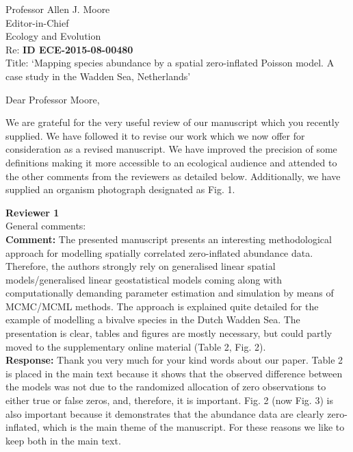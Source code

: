 \documentclass{letter}
\begin{document}
\begin{letter}{
Professor Allen J. Moore\\
Editor-in-Chief\\
Ecology and Evolution \\
\vspace{1cm}
Re: \textbf{ID ECE-2015-08-00480}\\
Title: `Mapping species abundance by a spatial zero-inflated Poisson model. A case study in the Wadden Sea, Netherlands'
}

\opening{Dear Professor Moore,}

We are grateful for the very useful review of our manuscript which you recently supplied. We have followed it to revise our work which we now offer for consideration as a revised manuscript. 
We have improved the precision of some definitions making it more accessible to an ecological audience and attended to the other comments from the reviewers as detailed below.  Additionally, we have supplied an organism photograph designated as Fig. 1.

\textbf{Reviewer 1}\\

General comments:\\
\textbf{Comment:} The presented manuscript presents an interesting methodological approach for modelling spatially correlated zero-inflated abundance data. Therefore, the authors strongly rely on  generalised linear spatial models/generalised linear geostatistical models coming along with computationally demanding parameter estimation and simulation by means of MCMC/MCML methods. The approach is explained quite detailed for the example of modelling a bivalve species in the Dutch Wadden Sea. The presentation is clear, tables and figures are mostly necessary, but could partly moved to the supplementary online material (Table 2, Fig. 2).\\
\textbf{Response:} 
Thank you very much for your kind words about our paper. Table 2 is placed in the main text because it shows that the observed difference between the models was not due to the randomized allocation of zero observations to either true or false zeros, and, therefore, it is important. Fig. 2 (now Fig. 3) is also important because it demonstrates that the abundance data are clearly zero-inflated, which is the main theme of the manuscript. For these reasons we like to keep both in the main text.


\end{letter}
\end{document}
